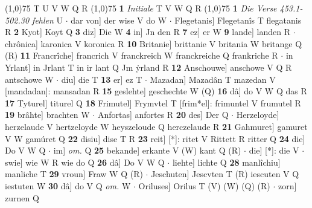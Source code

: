 \documentclass[8pt,a4paper,notitlepage]{article}
\begin{document}
\begin{table}[ht]
\begin{minipage}[t]{0.5\linewidth}
\begin{tabular}{rl}
\end{tabular}
\scriptsize
\line(1,0){75} \newline
T U V W Q R \newline
\line(1,0){75} \newline
\textbf{1} \textit{Initiale} T V W Q R  \newline
\line(1,0){75} \newline
\textbf{1} \textit{Die Verse 453.1-502.30 fehlen} U   $\cdot$ dar von] der wise V do W  $\cdot$ Flegetanis] Flegetanîs T flegatanis R \textbf{2} Kyot] Koyt Q \textbf{3} diz] Die W \textbf{4} in] Jn den R \textbf{7} ez] er W \textbf{9} lande] landen R  $\cdot$ chrônica] karonica V koronica R \textbf{10} Britanie] brittanie V britania W britange Q (R) \textbf{11} Francrîche] francrich V franckreich W franckreiche Q frankriche R  $\cdot$ in Yrlant] in Jrlant T in ir lant Q Jm ẏrland R \textbf{12} Anschouwe] anschowe V Q R antschowe W  $\cdot$ diu] die T \textbf{13} er] ez T  $\cdot$ Mazadan] Mazadân T mazedan V [mandadan]: mansadan R \textbf{15} geslehte] geschechte W (Q) \textbf{16} dâ] do V W Q das R \textbf{17} Tyturel] titurel Q \textbf{18} Frimutel] Frymvtel T [frim*el]: frimuntel V frumutel R \textbf{19} brâhte] brachten W  $\cdot$ Anfortas] anfortes R \textbf{20} des] Der Q  $\cdot$ Herzeloyde] herzelaude V hertzeloyde W heyszeloude Q herczelaude R \textbf{21} Gahmuret] gamuret V W gamúret Q \textbf{22} disiu] dise T R \textbf{23} reit] [*]: ritet V Rittett R ritter Q \textbf{24} die] Do V W Q  $\cdot$ im] \textit{om.} Q \textbf{25} bekande] erkante V (W) kant Q (R)  $\cdot$ die] [*]: die V  $\cdot$ swie] wie W R wie do Q \textbf{26} dâ] Do V W Q  $\cdot$ liehte] lichte Q \textbf{28} manlîchiu] manliche T \textbf{29} vroun] Fraw W Q (R)  $\cdot$ Jeschuten] Jescvten T (R) iescuten V Q iestuten W \textbf{30} dâ] do V Q \textit{om.} W  $\cdot$ Oriluses] Orilus T (V) (W) (Q) (R)  $\cdot$ zorn] zurnen Q \newline
\end{minipage}
\end{table}
\end{document}
